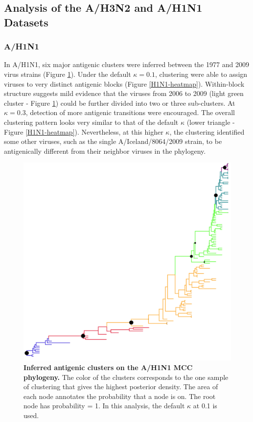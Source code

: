 \documentclass[11pt,oneside,letterpaper]{article}
\begin{document}

\subsection*{Analysis of the A/H3N2 and A/H1N1 Datasets}

\subsubsection*{A/H1N1}
In A/H1N1, six major antigenic clusters were inferred between the 1977 and 2009 virus strains (Figure \ref{H1N1-tree}). 
Under the default  $\kappa=0.1$, clustering were able to assign viruses to very distinct antigenic blocks  (Figure \ref{H1N1-heatmap}). 
Within-block structure suggests mild evidence that the viruses from 2006 to 2009 (light green cluster - Figure \ref{H1N1-tree}) could be further divided into two or three sub-clusters. 
At $\kappa=0.3$, detection of more antigenic transitions were encouraged. 
The overall clustering pattern looks very similar to that of the default $\kappa$ (lower triangle -  Figure \ref{H1N1-heatmap}). 
Nevertheless, at this higher $\kappa$, the clustering identified some other viruses, such as the single A/Iceland/8064/2009 strain, to be antigenically different from their neighbor viruses in the phylogeny. 


\begin{figure}[h]
	\centering		
	\includegraphics[width=1\textwidth]{figures/custom/H1N1MCC}
	\caption{\textbf{Inferred antigenic clusters on the A/H1N1 MCC phylogeny.}
 The color of the clusters corresponds to the one sample of clustering that gives the highest posterior density. The area of each node annotates the probability that a node is on. The root node has probability = 1. In this analysis, the default $\kappa$  at 0.1 is used.
	 		} 
	\label{H1N1-tree} 
\end{figure}
\end{document}

